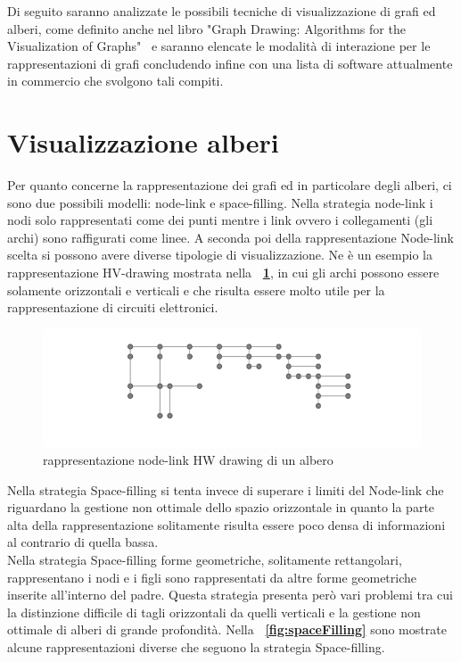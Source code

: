 \large{
Di seguito saranno analizzate le possibili tecniche di visualizzazione di grafi ed alberi, come definito anche nel libro "Graph Drawing: Algorithms for the Visualization of Graphs"~\cite{Battista:1998:GDA:551884}  e saranno elencate le modalità di interazione per le rappresentazioni di grafi concludendo infine con una lista di software attualmente in commercio che svolgono tali compiti.
\section{Visualizzazione alberi}
Per quanto concerne la rappresentazione dei grafi ed in particolare degli alberi, ci sono due possibili modelli: node-link e space-filling.
Nella strategia node-link i nodi solo rappresentati come dei punti mentre i link ovvero i collegamenti (gli archi) sono raffigurati come linee. A seconda poi della rappresentazione Node-link scelta si possono avere diverse tipologie di visualizzazione. Ne è un esempio la rappresentazione HV-drawing mostrata nella \textbf{\figurename~\ref{fig:nodeLink}}, in cui gli archi possono essere solamente orizzontali e verticali e che risulta essere molto utile per la rappresentazione di circuiti elettronici.\\
\begin{figure}[!htb]
	\begin{center}
		\includegraphics[width=0.8 \linewidth]{figure/nodeLink}
	\end{center}
	\caption{rappresentazione node-link HW drawing di un albero \label{fig:nodeLink}}
\end{figure}
Nella strategia Space-filling si tenta invece di superare i limiti del Node-link che riguardano la gestione non ottimale dello spazio orizzontale in quanto la parte alta della rappresentazione solitamente risulta essere poco densa di informazioni al contrario di quella bassa.\\
Nella strategia Space-filling forme geometriche, solitamente rettangolari, rappresentano i nodi e i figli sono rappresentati da altre forme geometriche inserite all'interno del padre. Questa strategia presenta però vari problemi tra cui la distinzione difficile di tagli orizzontali da quelli verticali e la gestione non ottimale di alberi di grande profondità. Nella \textbf{\figurename~\ref{fig:spaceFilling}} sono mostrate alcune rappresentazioni diverse che seguono la strategia Space-filling.
}
